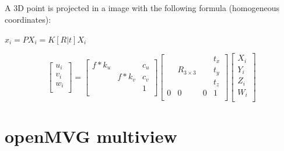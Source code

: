 \documentclass[11pt, letterpaper]{report}
\begin{document}
\paragraph*{}
A 3D point is projected in a image with the following formula (homogeneous coordinates):
\begin{center}
$ x_i = P X_i = K[R|t] X_i$
\end{center}

\begin{equation}
\begin{bmatrix}
u_i\\
v_i\\
w_i\\
\end{bmatrix} =
\begin{bmatrix}
f*k_u &  & c_u \\
 & f*k_v & c_v \\
 &  & 1\\
\end{bmatrix}
\begin{bmatrix}
 &  &  & t_x \\
 & R_{3 \times 3} &  & t_y \\
 &  &  & t_z \\
 0 & 0 & 0 & 1\\
\end{bmatrix}
\begin{bmatrix}
X_i\\
Y_i\\
Z_i\\
W_i\\
\end{bmatrix}
\end{equation}

\newpage
\chapter{openMVG multiview}
\end{document}
